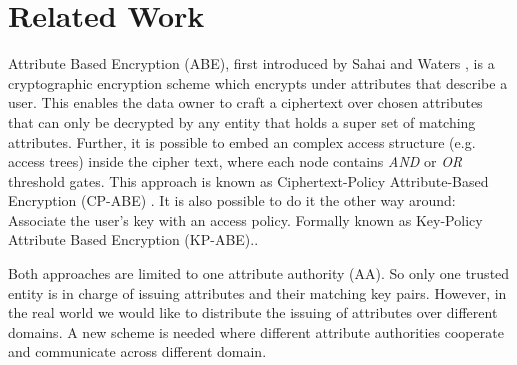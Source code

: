 \documentclass[twocolumn]{article}
\begin{document}



\section{Related Work}
Attribute Based Encryption (ABE), first introduced by Sahai and Waters \cite{sahai2005fuzzy}, is a cryptographic encryption scheme which encrypts under attributes that describe a user. This enables the data owner to craft a ciphertext over chosen attributes that can only be decrypted by any entity that holds a super set of matching attributes. Further, it is possible to embed an complex access structure (e.g. access trees) inside the cipher text, where each node contains \textit{AND} or \textit{OR} threshold gates. This approach is known as Ciphertext-Policy Attribute-Based Encryption (CP-ABE) \cite{bethencourt2007ciphertext}. 
It is also possible to do it the other way around: Associate the user's key with an access policy. Formally known as Key-Policy Attribute Based Encryption (KP-ABE).\cite{goyal2006attribute}. 

Both approaches are limited to one attribute authority (AA). So only one trusted entity is in charge of issuing attributes and their matching key pairs. However, in the real world we would like to distribute the issuing of attributes over different domains. A new scheme is needed where different attribute authorities cooperate and communicate across different domain.  

\end{document}
